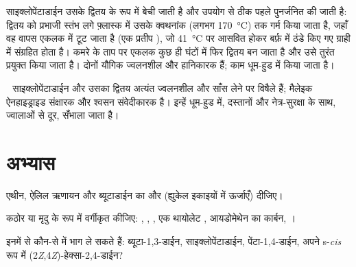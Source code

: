 \begin{inthelab}[डाइसाइक्लोपेंटाडाईन का भंजन]
साइक्लोपेंटाडाईन उसके द्वितय के रूप में बेची जाती है और उपयोग से ठीक पहले पुनर्जनित की जाती है: द्वितय को
प्रभाजी स्तंभ लगे फ़्लास्क में उसके क्वथनांक (लगभग \qty{170}{\degreeCelsius}) तक
गर्म किया जाता है, जहाँ वह वापस एकलक में टूट जाता है (एक प्रतीप ), जो \qty{41}{\degreeCelsius} पर आसवित होकर बर्फ़ में ठंडे किए गए ग्राही में
संग्रहित होता है। कमरे के ताप पर एकलक कुछ ही घंटों में फिर द्वितय बन जाता है और उसे
तुरंत प्रयुक्त किया जाता है। दोनों यौगिक ज्वलनशील और हानिकारक हैं; काम धूम-हुड में किया जाता है।
\end{inthelab}

\begin{safety}{\,\,}
साइक्लोपेंटाडाईन और उसका द्वितय अत्यंत ज्वलनशील और साँस लेने पर विषैले हैं; मैलेइक
ऐनहाइड्राइड संक्षारक और श्वसन संवेदीकारक है। इन्हें धूम-हुड में,
दस्तानों और नेत्र-सुरक्षा के साथ, ज्वालाओं से दूर, सँभाला जाता है।
\end{safety}

\section{अभ्यास}

\begin{exercise}[$\star$]\label{exo:b2:frontier-orbitals:1}
एथीन, ऐलिल ऋणायन
और ब्यूटाडाईन का  और  (ह्युकेल इकाइयों में ऊर्जाएँ) दीजिए।
\end{exercise}

\begin{exercise}[$\star$]\label{exo:b2:frontier-orbitals:2}
कठोर या मृदु के रूप में वर्गीकृत कीजिए: , , , एक थायोलेट , आयडोमेथेन
का कार्बन, ।
\end{exercise}

\begin{exercise}[$\star$]\label{exo:b2:frontier-orbitals:3}
इनमें से कौन-से   में भाग ले सकते हैं: ब्यूटा-1,3-डाईन,
साइक्लोपेंटाडाईन, पेंटा-1,4-डाईन, अपने s-\textit{cis} रूप में (2\textit{Z},4\textit{Z})-हेक्सा-2,4-डाईन?
\end{exercise}

